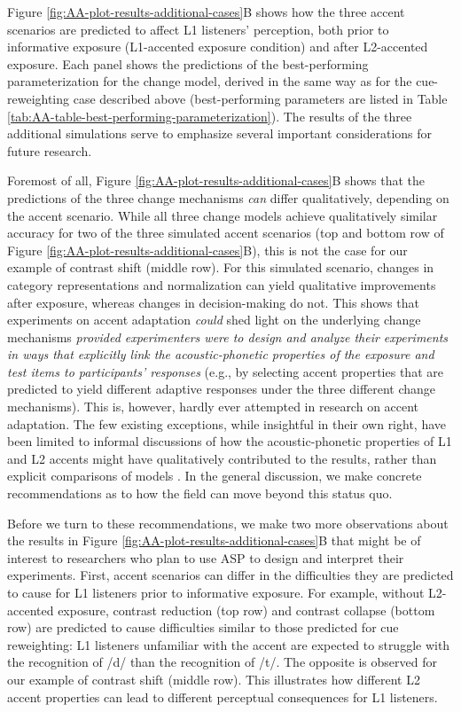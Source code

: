 \documentclass[
  11pt,
  man,floatsintext]{apa6}
\begin{document}
Figure \ref{fig:AA-plot-results-additional-cases}B shows how the three accent scenarios are predicted to affect L1 listeners' perception, both prior to informative exposure (L1-accented exposure condition) and after L2-accented exposure. Each panel shows the predictions of the best-performing parameterization for the change model, derived in the same way as for the cue-reweighting case described above (best-performing parameters are listed in Table \ref{tab:AA-table-best-performing-parameterization}). The results of the three additional simulations serve to emphasize several important considerations for future research.

Foremost of all, Figure \ref{fig:AA-plot-results-additional-cases}B shows that the predictions of the three change mechanisms \emph{can} differ qualitatively, depending on the accent scenario. While all three change models achieve qualitatively similar accuracy for two of the three simulated accent scenarios (top and bottom row of Figure \ref{fig:AA-plot-results-additional-cases}B), this is not the case for our example of contrast shift (middle row). For this simulated scenario, changes in category representations and normalization can yield qualitative improvements after exposure, whereas changes in decision-making do not. This shows that experiments on accent adaptation \emph{could} shed light on the underlying change mechanisms \emph{provided experimenters were to design and analyze their experiments in ways that explicitly link the acoustic-phonetic properties of the exposure and test items to participants' responses} (e.g., by selecting accent properties that are predicted to yield different adaptive responses under the three different change mechanisms). This is, however, hardly ever attempted in research on accent adaptation. The few existing exceptions, while insightful in their own right, have been limited to informal discussions of how the acoustic-phonetic properties of L1 and L2 accents might have qualitatively contributed to the results, rather than explicit comparisons of models \autocites[e.g.,][]{schertz2015,tan2021,xie2016jep}. In the general discussion, we make concrete recommendations as to how the field can move beyond this status quo.

Before we turn to these recommendations, we make two more observations about the results in Figure \ref{fig:AA-plot-results-additional-cases}B that might be of interest to researchers who plan to use ASP to design and interpret their experiments. First, accent scenarios can differ in the difficulties they are predicted to cause for L1 listeners prior to informative exposure. For example, without L2-accented exposure, contrast reduction (top row) and contrast collapse (bottom row) are predicted to cause difficulties similar to those predicted for cue reweighting: L1 listeners unfamiliar with the accent are expected to struggle with the recognition of /d/ than the recognition of /t/. The opposite is observed for our example of contrast shift (middle row). This illustrates how different L2 accent properties can lead to different perceptual consequences for L1 listeners.
\end{document}
